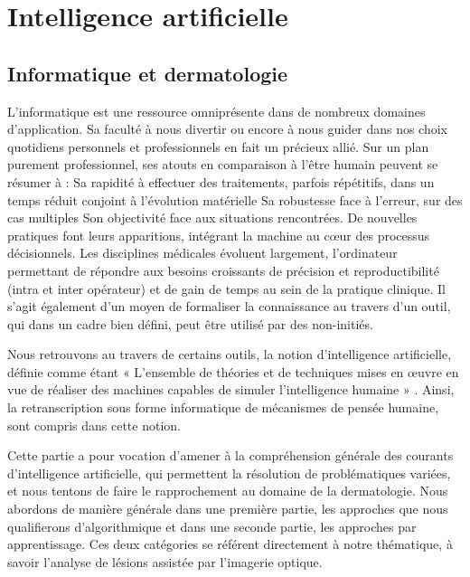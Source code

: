 \chapter{Intelligence artificielle}
\label{chap:chapter_3}
\section{Informatique et dermatologie}
L’informatique est une ressource omniprésente dans de nombreux domaines d’application. Sa faculté à nous divertir ou encore à nous guider dans nos choix quotidiens personnels et professionnels en fait un précieux allié. Sur un plan purement professionnel, ses atouts en comparaison à l’être humain peuvent se résumer à :
	Sa rapidité à effectuer des traitements, parfois répétitifs, dans un temps réduit conjoint à l’évolution matérielle
	Sa robustesse face à l’erreur, sur des cas multiples
	Son objectivité face aux situations rencontrées.
De nouvelles pratiques font leurs apparitions, intégrant la machine au cœur des processus décisionnels. Les disciplines médicales évoluent largement, l’ordinateur permettant de répondre aux besoins croissants de précision et reproductibilité (intra et inter opérateur) et de gain de temps au sein de la pratique clinique. Il s’agit également d’un moyen de formaliser la connaissance au travers d’un outil, qui dans un cadre bien défini, peut être utilisé par des non-initiés.\par
Nous retrouvons au travers de certains outils, la notion d’intelligence artificielle, définie comme étant « L’ensemble de théories et de techniques mises en œuvre en vue de réaliser des machines capables de simuler l'intelligence humaine » . Ainsi, la retranscription sous forme informatique de mécanismes de pensée humaine, sont compris dans cette notion.\par
Cette partie a pour vocation d’amener à la compréhension générale des courants d’intelligence artificielle, qui permettent la résolution de problématiques variées, et nous tentons de faire le rapprochement au domaine de la dermatologie. Nous abordons de manière générale dans une première partie, les approches que nous qualifierons d’algorithmique et dans une seconde partie, les approches par apprentissage. Ces deux catégories se référent directement à notre thématique, à savoir l’analyse de lésions assistée par l’imagerie optique.\par
 
